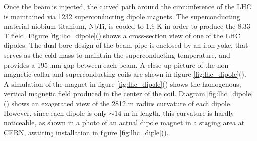 \par Once the beam is injected, the curved path around the
circumference of the LHC is maintained via 1232 superconducting dipole
magnets.  The superconducting material niobium-titanium, NbTi, is
cooled to 1.9 K in order to produce the 8.33 T field.  Figure
\ref{fig:lhc_dipole}() shows a cross-section
view of one of the LHC dipoles.  The dual-bore design of the beam-pipe
is enclosed by an iron yoke, that serves as the cold mass to maintain
the superconducting temperature, and provides a 195 mm gap between
each beam.  A close up picture of the non-magnetic collar and
superconducting coils are shown in figure
\ref{fig:lhc_dipole}().  A
simulation  of the magnet in figure
\ref{fig:lhc_dipole}() shows the
homogenous, vertical magnetic field produced in the center of the
coil.  Diagram \ref{fig:lhc_dipole}()
shows an exagerated view of the 2812 m radius curvature of each
dipole. However, since each dipole is only $\sim14$ m in length, this
curvature is hardly noticeable, as shown in a photo of an actual
dipole magnet in a staging area at CERN, awaiting installation in
figure \ref{fig:lhc_diple}().   

